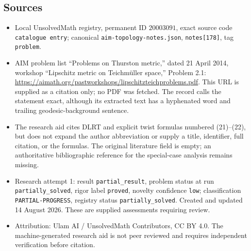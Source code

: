 \documentclass[11pt]{article}
\begin{document}
\subsection{Sources}
\begin{itemize}
\item Local UnsolvedMath registry, permanent ID \(20003091\), exact source code \texttt{catalogue entry}; canonical \texttt{aim-topology-notes.json}, \texttt{notes[178]}, tag \texttt{problem}.
\item AIM problem list ``Problems on Thurston metric,'' dated 21 April 2014, workshop ``Lipschitz metric on Teichm\"uller space,'' Problem 2.1: \url{https://aimath.org/pastworkshops/lipschitzteichproblems.pdf}. This URL is supplied as a citation only; no PDF was fetched. The record calls the statement exact, although its extracted text has a hyphenated word and trailing geodesic-background sentence.
\item The research aid cites DLRT and explicit twist formulas numbered (21)--(22), but does not expand the author abbreviation or supply a title, identifier, full citation, or the formulas. The original literature field is empty; an authoritative bibliographic reference for the special-case analysis remains missing.
\item Research attempt 1: result \texttt{partial\_result}, problem status at run \texttt{partially\_solved}, rigor label \texttt{proved}, novelty confidence \texttt{low}; classification \texttt{PARTIAL-PROGRESS}, registry status \texttt{partially\_solved}. Created and updated 14 August 2026. These are supplied assessments requiring review.
\item Attribution: Ulam AI / UnsolvedMath Contributors, CC BY 4.0. The machine-generated research aid is not peer reviewed and requires independent verification before citation.
\end{itemize}
\end{document}
